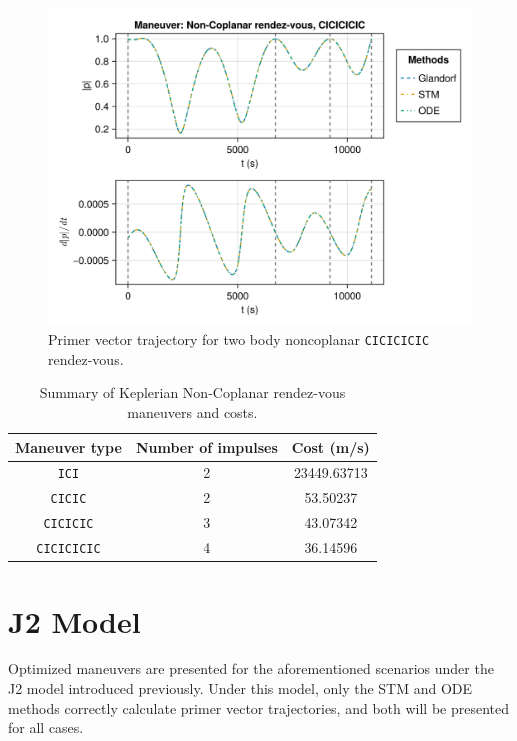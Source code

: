 \begin{figure}[htbp]
    \centering
    \includegraphics[width=\linewidth]{../results/two_body/ipv_noncop/CICICICIC_primer_vector.png}
    \caption{Primer vector trajectory for two body noncoplanar \texttt{CICICICIC} rendez-vous.}
    \label{fig:tb_ncop_CICICICIC_pv}
\end{figure}

\begin{table}[htbp]
    \centering
    \begin{tabular}{ccc} \toprule
        Maneuver type & Number of impulses & Cost (m/s) \\ \midrule
        \texttt{ICI} & 2 & 23449.63713 \\
        \texttt{CICIC} & 2 & 53.50237 \\
        \texttt{CICICIC} & 3 & 43.07342 \\
        \texttt{CICICICIC} & 4 & 36.14596 \\\bottomrule
    \end{tabular}
    \caption{Summary of Keplerian Non-Coplanar rendez-vous maneuvers and costs.}
    \label{tab:Keplerian_nr_summary}
\end{table}

\newpage
\FloatBarrier
\section{J2 Model}

Optimized maneuvers are presented for the aforementioned scenarios under the J2 model introduced previously. Under this model, only the STM and ODE methods correctly calculate primer vector trajectories, and both will be presented for all cases.


